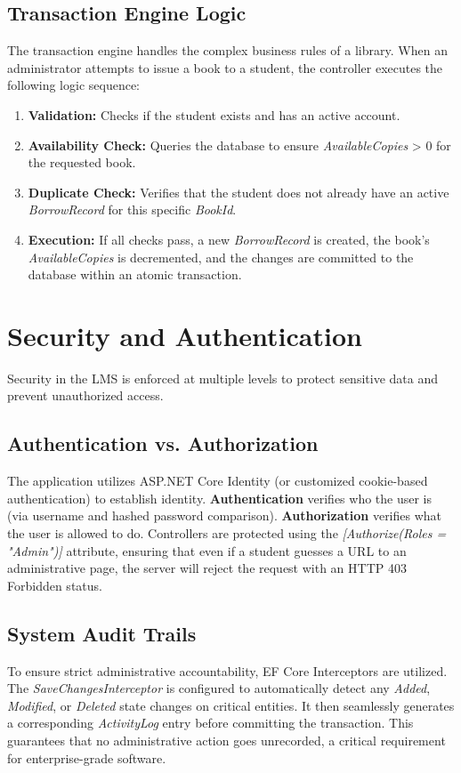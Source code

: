 \documentclass[conference]{IEEEtran}
\begin{document}
\subsection{Transaction Engine Logic}
The transaction engine handles the complex business rules of a library. When an administrator attempts to issue a book to a student, the controller executes the following logic sequence:
\begin{enumerate}
    \item \textbf{Validation:} Checks if the student exists and has an active account.
    \item \textbf{Availability Check:} Queries the database to ensure \textit{AvailableCopies} > 0 for the requested book.
    \item \textbf{Duplicate Check:} Verifies that the student does not already have an active \textit{BorrowRecord} for this specific \textit{BookId}.
    \item \textbf{Execution:} If all checks pass, a new \textit{BorrowRecord} is created, the book's \textit{AvailableCopies} is decremented, and the changes are committed to the database within an atomic transaction.
\end{enumerate}

\section{Security and Authentication}
Security in the LMS is enforced at multiple levels to protect sensitive data and prevent unauthorized access.

\subsection{Authentication vs. Authorization}
The application utilizes ASP.NET Core Identity (or customized cookie-based authentication) to establish identity. 
\textbf{Authentication} verifies who the user is (via username and hashed password comparison).
\textbf{Authorization} verifies what the user is allowed to do. Controllers are protected using the \textit{[Authorize(Roles = "Admin")]} attribute, ensuring that even if a student guesses a URL to an administrative page, the server will reject the request with an HTTP 403 Forbidden status.

\subsection{System Audit Trails}
To ensure strict administrative accountability, EF Core Interceptors are utilized. The \textit{SaveChangesInterceptor} is configured to automatically detect any \textit{Added}, \textit{Modified}, or \textit{Deleted} state changes on critical entities. It then seamlessly generates a corresponding \textit{ActivityLog} entry before committing the transaction. This guarantees that no administrative action goes unrecorded, a critical requirement for enterprise-grade software.
\end{document}
